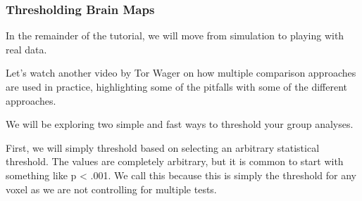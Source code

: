 \documentclass[letterpaper,10pt,english]{sphinxmanual}
\begin{document}
\subsubsection{Thresholding Brain Maps}
\label{\detokenize{content/Thresholding_Group_Analyses:thresholding-brain-maps}}
In the remainder of the tutorial, we will move from simulation to playing with real data.

Let’s watch another video by Tor Wager on how multiple comparison approaches are used in practice, highlighting some of the pitfalls with some of the different approaches.

\begin{sphinxVerbatim}[commandchars=\\\{\}]
\end{sphinxVerbatim}

\noindent{}

We will be exploring two simple and fast ways to threshold your group analyses.

First, we will simply threshold based on selecting an arbitrary statistical threshold. The values are completely arbitrary, but it is common to start with something like p \textless{} .001. We call this  because this is simply the threshold for any voxel as we are not controlling for multiple tests.
\end{document}
